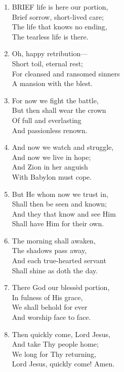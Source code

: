 \documentclass[11pt,a4paper]{article}
\begin{document}
\begin{enumerate}
    \item BRIEF life is here our portion, \\
        Brief sorrow, short-lived care; \\
        The life that knows no ending, \\
        The tearless life is there.

    \item Oh, happy retribution--- \\
        Short toil, eternal rest; \\
        For cleansed and ransomed sinners \\
        A mansion with the blest.

    \item For now we fight the battle, \\
        But then shall wear the crown \\
        Of full and everlasting \\
        And passionless renown.

    \item And now we watch and struggle, \\
        And now we live in hope; \\
        And Zion in her anguish \\
        With Babylon must cope.

    \item But He whom now we trust in, \\
        Shall then be seen and known; \\
        And they that know and see Him \\
        Shall have Him for their own.

    \item The morning shall awaken, \\
        The shadows pass away, \\
        And each true-hearted servant \\
        Shall shine as doth the day.

    \item There God our bless\`ed portion, \\
        In fulness of His grace, \\
        We shall behold for ever \\
        And worship face to face.

    \item Then quickly come, Lord Jesus, \\
        And take Thy people home; \\
        We long for Thy returning, \\
        Lord Jesus, quickly come! Amen.

\end{enumerate}
\end{document}
